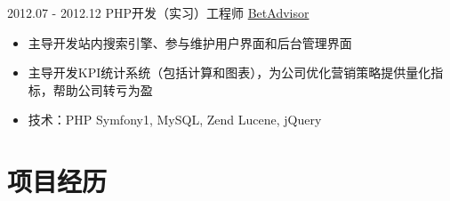 \documentclass[letterpaper]{twentysecondcv} %
\begin{document}
\begin{twentyfluid}
\twentyitemfluid
   		{2012.07 - 2012.12}
        {PHP开发（实习）工程师}
        {\href{https://www.betadvisor.com/}{BetAdvisor}}
        {\\  }
        {
        \vspace{-0.2cm}
        \begin{itemize}
        	\item 主导开发站内搜索引擎、参与维护用户界面和后台管理界面
        	\item 主导开发KPI统计系统（包括计算和图表），为公司优化营销策略提供量化指标，帮助公司转亏为盈
        	\item 技术：PHP Symfony1, MySQL, Zend Lucene, jQuery
    	\end{itemize}
    	}

\end{twentyfluid}

\vspace{-0.2cm}
\section{项目经历}
\end{document}
